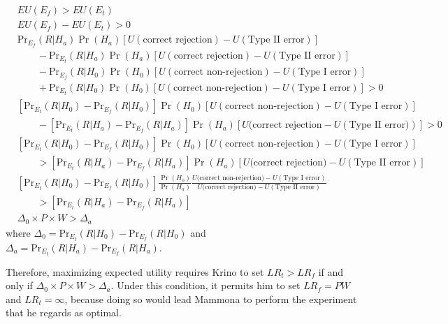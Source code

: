 \documentclass{article}
\theoremstyle{definition}
\begin{document}
\begin{align*}
&EU(E_f)>EU(E_t)\\
&EU(E_f)-EU(E_t)>0\\
& \mbox{Pr}_{E_f}(R|H_a)\Pr(H_a)[U(\mbox{correct rejection})-U(\mbox{Type II error})]\\
&\qquad - \mbox{Pr}_{E_t}(R|H_a)\Pr(H_a)[U(\mbox{correct rejection})-U(\mbox{Type II error})]\\
&\qquad -\mbox{Pr}_{E_f}(R|H_0)\Pr(H_0)[U(\mbox{correct non-rejection})-U(\mbox{Type I error})]\\
&\qquad + \mbox{Pr}_{E_t}(R|H_0)\Pr(H_0)[U(\mbox{correct non-rejection})-U(\mbox{Type I error})] > 0\\
&[\mbox{Pr}_{E_t}(R|H_0)-\mbox{Pr}_{E_f}(R|H_0)]\Pr(H_0)[U(\mbox{correct non-rejection})-U(\mbox{Type I error})]\\
&\qquad - [\mbox{Pr}_{E_t}(R|H_a)- \mbox{Pr}_{E_f}(R|H_a)]\Pr(H_a)[U(\mbox{correct rejection}-U(\mbox{Type II error)})]> 0\\
&[\mbox{Pr}_{E_t}(R|H_0)-\mbox{Pr}_{E_f}(R|H_0)]\Pr(H_0)[U(\mbox{correct non-rejection})-U(\mbox{Type I error})]\\
&\qquad > [\mbox{Pr}_{E_t}(R|H_a)- \mbox{Pr}_{E_f}(R|H_a)]\Pr(H_a)[U(\mbox{correct rejection)}-U(\mbox{Type II error})]\\
&[\mbox{Pr}_{E_t}(R|H_0)-\mbox{Pr}_{E_f}(R|H_0)] \frac{\Pr(H_0)}{\Pr(H_a)}\frac{U(\mbox{correct non-rejection)}-U(\mbox{Type I error})}{U(\mbox{correct rejection)}-U(\mbox{Type II error})}
\\
&\qquad > [\mbox{Pr}_{E_t}(R|H_a)- \mbox{Pr}_{E_f}(R|H_a)]\\
& \Delta_0\times P\times W >\Delta_a
\end{align*}
where $\Delta_0=\mbox{Pr}_{E_t}(R|H_0)-\mbox{Pr}_{E_f}(R|H_0)$ and $\Delta_a=\mbox{Pr}_{E_t}(R|H_a)-\mbox{Pr}_{E_f}(R|H_a)$.

Therefore, maximizing expected utility requires Krino to set $LR_t>LR_f$ if and only if $\Delta_0\times P\times W >\Delta_a$.
Under this condition, it permits him to set $LR_f=P W$ and $LR_t=\infty$, because doing so would lead Mammona to perform the experiment that he regards as optimal.
\end{document}
